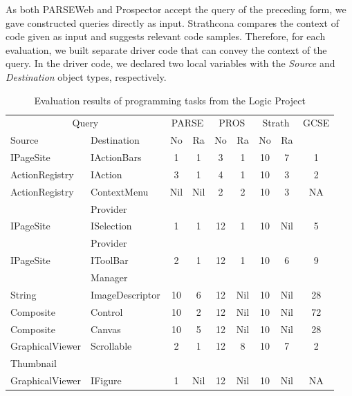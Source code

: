 \documentclass{fp035-thummalapenta}
\begin{document}
As both PARSEWeb and Prospector accept the query of the preceding
form, we gave constructed queries directly as input. Strathcona
compares the context of code given as input and  suggests relevant
code samples. Therefore, for each evaluation, we built separate
driver code that can convey the context of the query. In the driver
code, we declared two local variables with the \emph{Source} and
\emph{Destination} object types, respectively.

\setlength{\tabcolsep}{1pt}
\begin{table}[t]
\begin{SmallOut}
\begin{CodeOut}
\begin{center}
\centering \caption {\label{tab:realprojevaluation} Evaluation results of programming tasks from
the Logic Project}
\begin {tabular} {|l|l|c|c|c|c|c|c|c|}
\hline
\multicolumn{2}{|c|}{Query}&\multicolumn{2}{|c|}{PARSE}&\multicolumn{2}{|c|}{PROS}&\multicolumn{2}{|c|}{Strath}&GCSE\\
\cline{1-8}
Source&Destination&No&Ra&No&Ra&No&Ra&\\
\hline
\hline IPageSite&IActionBars&1&1&3&1&10&7&1\\
\hline ActionRegistry&IAction&3&1&4&1&10&3&2\\
\hline ActionRegistry&ContextMenu&Nil&Nil&2&2&10&3&NA\\
                &Provider&&&&&&&\\
\hline IPageSite&ISelection&1&1&12&1&10&Nil&5\\
             &Provider&&&&&&&\\
\hline IPageSite&IToolBar&2&1&12&1&10&6&9\\
              &Manager&&&&&&&\\
\hline String&ImageDescriptor&10&6&12&Nil&10&Nil&28\\
\hline Composite&Control&10&2&12&Nil&10&Nil&72\\
\hline Composite&Canvas&10&5&12&Nil&10&Nil&28\\
\hline GraphicalViewer&Scrollable&2&1&12&8&10&7&2\\
              Thumbnail&&&&&&&&\\
\hline GraphicalViewer&IFigure&1&Nil&12&Nil&10&Nil&NA\\
\hline
\end{tabular}
\end{center}
\end{CodeOut}
\end{SmallOut}
\vspace*{-6ex}
\end{table}
\end{document}
